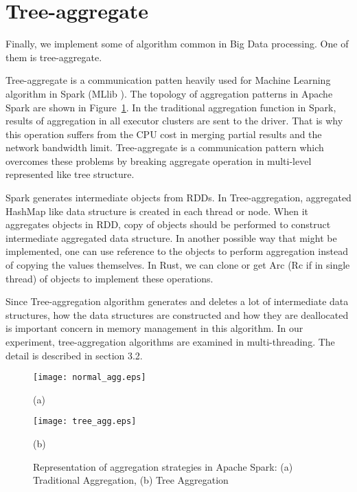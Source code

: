 \section{Tree-aggregate}
\label{sec:concept_treeagg}
Finally, we implement some of algorithm common in Big Data processing. One of them is tree-aggregate.

Tree-aggregate is a communication patten heavily used for Machine Learning algorithm in Spark (MLlib \cite{DBLP:journals/jmlr/MengBYSVLFTAOXX16}). 
The topology of aggregation patterns in Apache Spark are shown in Figure~\ref{fig:aggregationk_patttern}. 
In the traditional aggregation function in Spark, results of aggregation in all executor clusters are sent to the driver. 
That is why this operation suffers from the CPU cost in merging partial results and the network bandwidth limit.
Tree-aggregate is a communication pattern which overcomes these problems by breaking aggregate operation in multi-level represented like tree structure.

Spark generates intermediate objects from RDDs. In Tree-aggregation, aggregated HashMap like data structure is created in each thread or node. 
When it aggregates objects in RDD, copy of objects should be performed to construct intermediate aggregated data structure.
In another possible way that might be implemented, one can use reference to the objects to perform aggregation instead of copying the values themselves.
In Rust, we can clone or get Arc (Rc if in single thread) of objects to implement these operations.

Since Tree-aggregation algorithm generates and deletes a lot of intermediate data structures, 
how the data structures are constructed and how they are deallocated is important concern in memory management in this algorithm.
In our experiment, tree-aggregation algorithms are examined in multi-threading. The detail is described in section 3.2.

\begin{figure}[htb]
    \begin{minipage}[t]{0.5\linewidth}\centering
        \texttt{[image: normal\_agg.eps]}
        \medskip
        \centerline{(a)}
        \end{minipage}\hfill
        \begin{minipage}[t]{0.5\linewidth}\centering
        \texttt{[image: tree\_agg.eps]} 
        \medskip
        \centerline{(b)}
    \end{minipage}\hfill
    \caption{Representation of aggregation strategies in Apache Spark: (a) Traditional Aggregation, (b) Tree Aggregation}
    \label{fig:aggregationk_patttern}
\end{figure}


